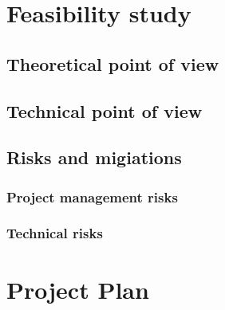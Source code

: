 \documentclass[notitlepage]{article}
\begin{document}
\begin{flushleft}
\section{Feasibility study}

\subsection{Theoretical point of view}

\subsection{Technical point of view}

\subsection{Risks and migiations}

\subsubsection{Project management risks}

\subsubsection{Technical risks}

\section{Project Plan}


\end{flushleft}
\end{document}
